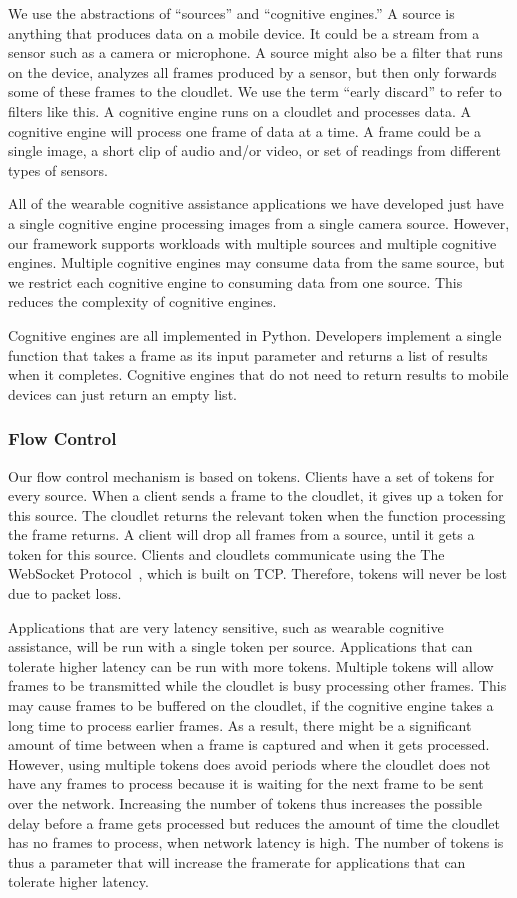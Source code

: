 We use the abstractions of ``sources'' and ``cognitive engines.'' A source is
anything that produces data on a mobile device. It could be a stream from a
sensor such as a camera or microphone. A source might also be a filter that runs
on the device, analyzes all frames produced by a sensor, but then only forwards
some of these frames to the
cloudlet. We use the term ``early discard'' to refer to filters like
this. A cognitive engine runs on a cloudlet and processes data. A cognitive
engine will process one frame of data at a time. A frame could be a single
image, a short clip of audio and/or video, or set of readings from different
types of sensors.

All of the wearable cognitive assistance applications we have developed just
have a single cognitive engine processing images from a single camera source.
However, our framework supports workloads with multiple sources and multiple
cognitive engines. Multiple cognitive engines may consume data from the same
source, but we restrict each cognitive engine to consuming data from one source.
This reduces the complexity of cognitive engines.

Cognitive engines are all implemented in Python. Developers implement a single
function that takes a frame as its input parameter and returns a list of
results when it completes. Cognitive engines that do not need to return results
to mobile devices can just return an empty list.

\subsubsection{Flow Control}

Our flow control mechanism is
based on tokens. Clients have a set of tokens for every source. When a client
sends a frame to the cloudlet, it gives up a token for this source. The cloudlet
returns the relevant token when the function processing the frame returns.
A client will drop all frames from a source, until it gets a token for this
source. Clients and
cloudlets communicate using the The WebSocket Protocol~\cite{websocket}, which
is built on TCP.
Therefore, tokens will never be lost due to packet loss.

Applications that are very latency sensitive, such as
wearable cognitive assistance, will be run with a single token per source.
Applications that can tolerate higher latency can be run with more tokens.
Multiple tokens
will allow frames to be transmitted while the cloudlet is busy processing other
frames. This may cause frames to be buffered on the cloudlet, if the
cognitive engine takes a long time to process earlier frames. As a result, there
might be a significant amount of time between when a frame is captured and when
it gets processed. However, using multiple tokens does avoid periods where the
cloudlet does not have any frames to process because it is waiting for the next
frame to be sent over the network. Increasing
the number of tokens thus increases the possible delay before a frame gets
processed but reduces the amount of time the cloudlet has no frames to process,
when network latency is high.
The number of tokens is thus a parameter that will
increase the framerate for applications that can tolerate higher latency.

